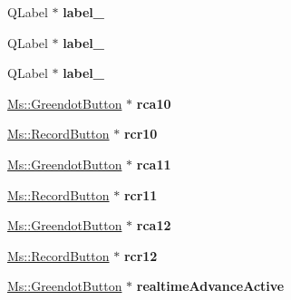 \begin{DoxyCompactItemize}
Q\+Label $\ast$ {\bfseries label\+\_}
\item 
\mbox{\label{class_ui___prefs_dialog_base_a0d34f30ad35d449bfea6ef50cb73dfde}} 
Q\+Label $\ast$ {\bfseries label\+\_}
\item 
\mbox{\label{class_ui___prefs_dialog_base_a1ce9db0f7d1e694dc1922fbad34a3bf9}} 
Q\+Label $\ast$ {\bfseries label\+\_}
\item 
\mbox{\label{class_ui___prefs_dialog_base_a7bafe1798310cfc7ca8b682dcc9f5756}} 
\hyperlink{class_ms_1_1_greendot_button}{Ms\+::\+Greendot\+Button} $\ast$ {\bfseries rca10}
\item 
\mbox{\label{class_ui___prefs_dialog_base_a45607c4c5d5cac363b25054cbc675547}} 
\hyperlink{class_ms_1_1_record_button}{Ms\+::\+Record\+Button} $\ast$ {\bfseries rcr10}
\item 
\mbox{\label{class_ui___prefs_dialog_base_ac71e1c97d588f0f5b515a2f68e42e8a4}} 
\hyperlink{class_ms_1_1_greendot_button}{Ms\+::\+Greendot\+Button} $\ast$ {\bfseries rca11}
\item 
\mbox{\label{class_ui___prefs_dialog_base_a8c757482b0e045ae9367a4e7422e22cc}} 
\hyperlink{class_ms_1_1_record_button}{Ms\+::\+Record\+Button} $\ast$ {\bfseries rcr11}
\item 
\mbox{\label{class_ui___prefs_dialog_base_ab8ac5a8b531e20c38a6ab43bdadd3bb9}} 
\hyperlink{class_ms_1_1_greendot_button}{Ms\+::\+Greendot\+Button} $\ast$ {\bfseries rca12}
\item 
\mbox{\label{class_ui___prefs_dialog_base_a9188945405f3fdcf454cef4532de0a88}} 
\hyperlink{class_ms_1_1_record_button}{Ms\+::\+Record\+Button} $\ast$ {\bfseries rcr12}
\item 
\mbox{\label{class_ui___prefs_dialog_base_a8e4e0e7169ffc4807517686a4b6c23af}} 
\hyperlink{class_ms_1_1_greendot_button}{Ms\+::\+Greendot\+Button} $\ast$ {\bfseries realtime\+Advance\+Active}
\item 

\end{DoxyCompactItemize}
